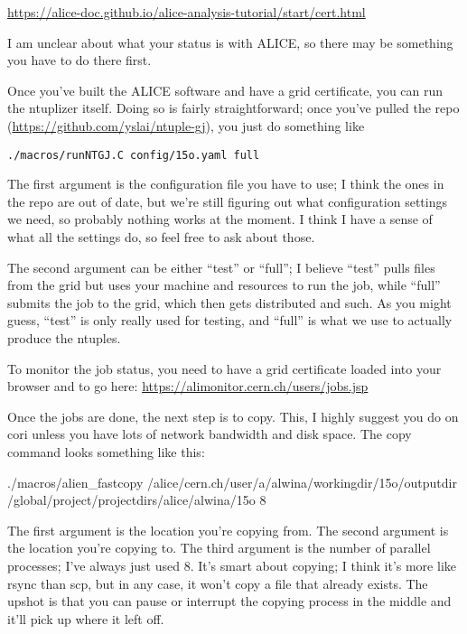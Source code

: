 \documentclass[12pt]{article}
\begin{document}
\href{https://alice-doc.github.io/alice-analysis-tutorial/start/cert.html}{https://alice-doc.github.io/alice-analysis-tutorial/start/cert.html}

I am unclear about what your status is with ALICE, so there may be something you have to do there first.

Once you've built the ALICE software and have a grid certificate, you can run the ntuplizer itself. Doing so is fairly straightforward; once you've pulled the repo (\href{https://github.com/yslai/ntuple-gj}{https://github.com/yslai/ntuple-gj}), you just do something like

\verb|./macros/runNTGJ.C config/15o.yaml full|

The first argument is the configuration file you have to use; I think the ones in the repo are out of date, but we're still figuring out what configuration settings we need, so probably nothing works at the moment. I think I have a sense of what all the settings do, so feel free to ask about those.

The second argument can be either ``test'' or ``full''; I believe ``test'' pulls files from the grid but uses your machine and resources to run the job, while ``full'' submits the job to the grid, which then gets distributed and such. As you might guess, ``test'' is only really used for testing, and ``full'' is what we use to actually produce the ntuples.

To monitor the job status, you need to have a grid certificate loaded into your browser and to go here: \href{https://alimonitor.cern.ch/users/jobs.jsp}{https://alimonitor.cern.ch/users/jobs.jsp}

Once the jobs are done, the next step is to copy. This, I highly suggest you do on cori unless you have lots of network bandwidth and disk space. The copy command looks something like this:

\begin{tcolorbox}
\begin{verbnobox}[\tiny]
./macros/alien_fastcopy /alice/cern.ch/user/a/alwina/workingdir/15o/outputdir /global/project/projectdirs/alice/alwina/15o 8
\end{verbnobox}  
\end{tcolorbox}

The first argument is the location you're copying from. The second argument is the location you're copying to. The third argument is the number of parallel processes; I've always just used 8. It's smart about copying; I think it's more like rsync than scp, but in any case, it won't copy a file that already exists. The upshot is that you can pause or interrupt the copying process in the middle and it'll pick up where it left off.
\end{document}

